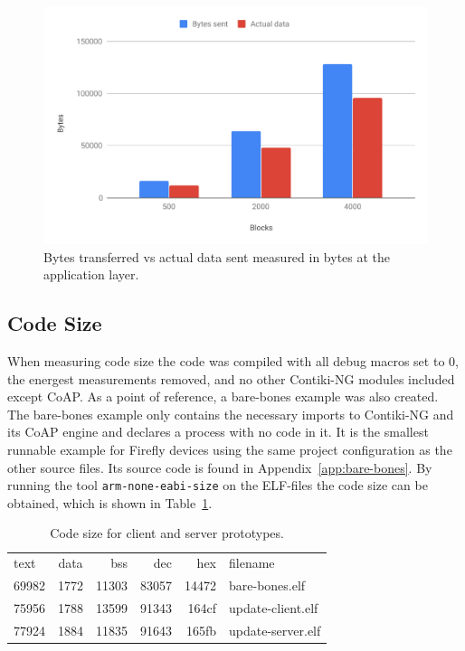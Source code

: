 \documentclass[0-thesis.tex]{subfiles}
\begin{document}
\begin{figure}[h!]
    \caption{Bytes transferred vs actual data sent measured in bytes at the application layer.}
    \label{fig:communication-overhead}
    \includegraphics[scale=0.65]{images/communication-overhead.pdf}
\end{figure}

\subsection{Code Size}
\label{ssec:code-size}
When measuring code size the code was compiled with all debug macros set to 0, the
energest measurements removed, and no other Contiki-NG modules included except CoAP. As a
point of reference, a bare-bones example was also created. The bare-bones example only
contains the necessary imports to Contiki-NG and its CoAP engine and declares a process
with no code in it. It is the smallest runnable example for Firefly devices using the same
project configuration as the other source files. Its source code is found in
Appendix~\ref{app:bare-bones}. By running the tool \texttt{arm-none-eabi-size} on the
ELF-files the code size can be obtained, which is shown in Table~\ref{tab:code-size}.

\begin{table}[!t]
\begin{tabular}{l c r r r l}
text	&  data	 &  bss	 &  dec	 &  hex&filename\\
69982	&  1772	 &11303	 &83057	 &14472&bare-bones.elf\\
75956	&  1788	 &13599	 &91343	 &164cf&update-client.elf\\
77924	&  1884	 &11835	 &91643	 &165fb&update-server.elf
\end{tabular}
\caption{Code size for client and server prototypes.}
\label{tab:code-size}
\end{table}
\end{document}
